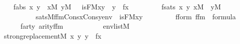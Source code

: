\begin{isabellebody}
\ \ \isanewline
\ \ \ \ f{\isacharunderscore}{\kern0pt}abs{\isacharcolon}{\kern0pt}\ {\isachardoublequoteopen}{\isasymAnd}x\ y{\isachardot}{\kern0pt}\ {\isasymlbrakk}\ x{\isasymin}M{\isacharsemicolon}{\kern0pt}\ y{\isasymin}M\ {\isasymrbrakk}\ {\isasymLongrightarrow}\ is{\isacharunderscore}{\kern0pt}F{\isacharparenleft}{\kern0pt}{\isacharhash}{\kern0pt}{\isacharhash}{\kern0pt}M{\isacharcomma}{\kern0pt}x{\isacharcomma}{\kern0pt}y{\isacharparenright}{\kern0pt}\ {\isasymlongleftrightarrow}\ y\ {\isacharequal}{\kern0pt}\ f{\isacharparenleft}{\kern0pt}x{\isacharparenright}{\kern0pt}{\isachardoublequoteclose}\isanewline
\ \ \ \ \isanewline
\ \ \ \ f{\isacharunderscore}{\kern0pt}sats{\isacharcolon}{\kern0pt}\ {\isachardoublequoteopen}{\isasymAnd}x\ y{\isachardot}{\kern0pt}\ {\isasymlbrakk}x{\isasymin}M\ {\isacharsemicolon}{\kern0pt}\ y{\isasymin}M\ {\isasymrbrakk}\ {\isasymLongrightarrow}\isanewline
\ \ \ \ \ \ \ \ \ \ \ \ \ sats{\isacharparenleft}{\kern0pt}M{\isacharcomma}{\kern0pt}f{\isacharunderscore}{\kern0pt}fm{\isacharcomma}{\kern0pt}Cons{\isacharparenleft}{\kern0pt}x{\isacharcomma}{\kern0pt}Cons{\isacharparenleft}{\kern0pt}y{\isacharcomma}{\kern0pt}env{\isacharparenright}{\kern0pt}{\isacharparenright}{\kern0pt}{\isacharparenright}{\kern0pt}\ {\isasymlongleftrightarrow}\ is{\isacharunderscore}{\kern0pt}F{\isacharparenleft}{\kern0pt}{\isacharhash}{\kern0pt}{\isacharhash}{\kern0pt}M{\isacharcomma}{\kern0pt}x{\isacharcomma}{\kern0pt}y{\isacharparenright}{\kern0pt}{\isachardoublequoteclose}\isanewline
\ \ \ \ \isanewline
\ \ \ \ f{\isacharunderscore}{\kern0pt}form{\isacharcolon}{\kern0pt}\ {\isachardoublequoteopen}f{\isacharunderscore}{\kern0pt}fm\ {\isasymin}\ formula{\isachardoublequoteclose}\isanewline
\ \ \ \ \isanewline
\ \ \ \ f{\isacharunderscore}{\kern0pt}arty{\isacharcolon}{\kern0pt}\ {\isachardoublequoteopen}arity{\isacharparenleft}{\kern0pt}f{\isacharunderscore}{\kern0pt}fm{\isacharparenright}{\kern0pt}\ {\isacharequal}{\kern0pt}\ {}{\isachardoublequoteclose}\isanewline
\ \ \ \ \isanewline
\ \ \ \ {\isachardoublequoteopen}env{\isasymin}list{\isacharparenleft}{\kern0pt}M{\isacharparenright}{\kern0pt}{\isachardoublequoteclose}\isanewline
\ \ \isanewline
\ \ \ \ {\isachardoublequoteopen}strong{\isacharunderscore}{\kern0pt}replacement{\isacharparenleft}{\kern0pt}{\isacharhash}{\kern0pt}{\isacharhash}{\kern0pt}M{\isacharcomma}{\kern0pt}\ {\isasymlambda}x\ y{\isachardot}{\kern0pt}\ y\ {\isacharequal}{\kern0pt}\ f{\isacharparenleft}{\kern0pt}x{\isacharparenright}{\kern0pt}{\isacharparenright}{\kern0pt}{\isachardoublequoteclose}\isanewline

\end{isabellebody}
